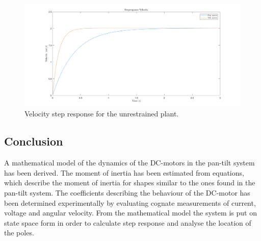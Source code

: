 \documentclass[../../main.tex]{subfiles}
\begin{document}
\begin{figure}
    \centering
    \includegraphics[width = 0.9 \textwidth]{Sections/System_Modelling/Images/stepResponseVelPlant.png}
    \caption{Velocity step response for the unrestrained plant.}
    \label{fig:StepVelPlant}
\end{figure}



\subsection{Conclusion}

A mathematical model of the dynamics of the DC-motors in the pan-tilt system has been derived. The moment of inertia has been estimated from equations, which describe the moment of inertia for shapes similar to the ones found in the pan-tilt system. The coefficients describing the behaviour of the DC-motor has been determined experimentally by evaluating cognate measurements of current, voltage and angular velocity. From the mathematical model the system is put on state space form in order to calculate step response and analyse the location of the poles.
\end{document}
